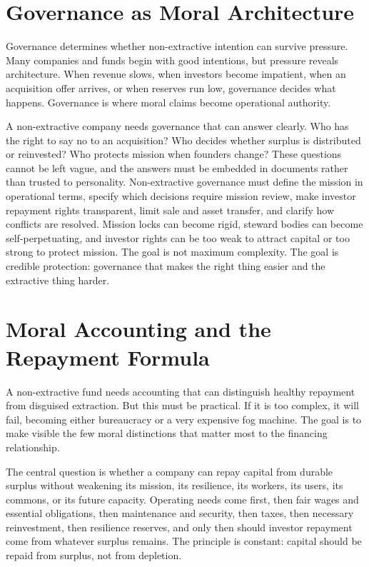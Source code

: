 \documentclass[11pt,a4paper,oneside]{book}
\begin{document}
\section*{Governance as Moral Architecture}

Governance determines whether non-extractive intention can survive pressure. Many companies and funds begin with good intentions, but pressure reveals architecture. When revenue slows, when investors become impatient, when an acquisition offer arrives, or when reserves run low, governance decides what happens. Governance is where moral claims become operational authority.

A non-extractive company needs governance that can answer clearly. Who has the right to say no to an acquisition? Who decides whether surplus is distributed or reinvested? Who protects mission when founders change? These questions cannot be left vague, and the answers must be embedded in documents rather than trusted to personality. Non-extractive governance must define the mission in operational terms, specify which decisions require mission review, make investor repayment rights transparent, limit sale and asset transfer, and clarify how conflicts are resolved. Mission locks can become rigid, steward bodies can become self-perpetuating, and investor rights can be too weak to attract capital or too strong to protect mission. The goal is not maximum complexity. The goal is credible protection: governance that makes the right thing easier and the extractive thing harder.

\section*{Moral Accounting and the Repayment Formula}

A non-extractive fund needs accounting that can distinguish healthy repayment from disguised extraction. But this must be practical. If it is too complex, it will fail, becoming either bureaucracy or a very expensive fog machine. The goal is to make visible the few moral distinctions that matter most to the financing relationship.

The central question is whether a company can repay capital from durable surplus without weakening its mission, its resilience, its workers, its users, its commons, or its future capacity. Operating needs come first, then fair wages and essential obligations, then maintenance and security, then taxes, then necessary reinvestment, then resilience reserves, and only then should investor repayment come from whatever surplus remains. The principle is constant: capital should be repaid from surplus, not from depletion.
\end{document}
